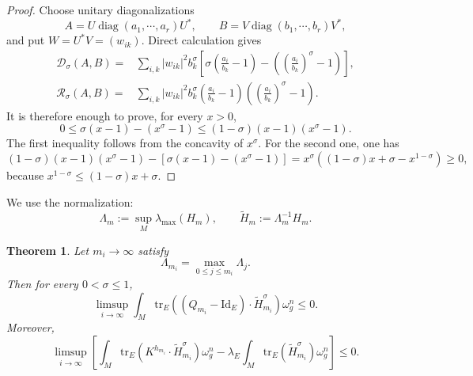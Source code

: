 \documentclass[12pt, reqno]{amsart}
\newcommand\cD{{\mathcal D}}
\newcommand\cR{{\mathcal R}}
\newcommand{\id}{\mathrm{Id}}
\theoremstyle{plain}
\newtheorem{thm}{Theorem}[section]
\theoremstyle{definition}
\newcommand{\btheorem}{\begin{thm}}
\newcommand{\etheorem}{\end{thm}}
\newcommand{\beq}{\begin{equation}}
\newcommand{\eeq}{\end{equation}}
\renewcommand{\tilde}{\widetilde}
\newcommand{\diag}{\operatorname{diag}}
\renewcommand{\>}{\rightarrow}
\newcommand{\tr}{\mathrm{tr}}
\numberwithin{equation}{section}
\begin{document}
\begin{proof}
	Choose unitary diagonalizations
	\[
	A=U\diag(a_1,\cdots,a_r)U^*,
	\qquad
	B=V\diag(b_1,\cdots,b_r)V^*,
	\]
	and put $W=U^*V=(w_{ik})$.  Direct calculation gives
	\begin{align}
	\cD_\sigma(A,B)
	={}&\sum_{i,k}|w_{ik}|^2b_k^\sigma
	\left[
	\sigma\left(\frac{a_i}{b_k}-1\right)
	-\left(\left(\frac{a_i}{b_k}\right)^\sigma-1\right)
	\right],
	\label{D double sum}\\
	\cR_\sigma(A,B)
	={}&\sum_{i,k}|w_{ik}|^2b_k^\sigma
	\left(\frac{a_i}{b_k}-1\right)
	\left(\left(\frac{a_i}{b_k}\right)^\sigma-1\right).
	\label{R double sum}
	\end{align}
	It is therefore enough to prove, for every $x>0$,
	\begin{equation}
	0\leq\sigma(x-1)-(x^\sigma-1)
	\leq(1-\sigma)(x-1)(x^\sigma-1).
	\label{scalar remainder inequality}
	\end{equation}
	The first inequality follows from the concavity of $x^\sigma$.  For the second one, one has
	\beq 
	(1-\sigma)(x-1)(x^\sigma-1)
	-\left[\sigma(x-1)-(x^\sigma-1)\right]
	=x^\sigma\left((1-\sigma)x+\sigma-x^{1-\sigma}\right)\geq0,
	\eeq
	because $x^{1-\sigma}\leq(1-\sigma)x+\sigma$. 
\end{proof}


\noindent
We use the normalization:
\begin{equation}
\Lambda_m:=\sup_M\lambda_{\max}(H_m),
\qquad
\tilde H_m:=\Lambda_m^{-1}H_m.
\label{Lambda tilde definition}
\end{equation}

\btheorem\label{record index thm}
Let $m_i\to\infty$ satisfy
\begin{equation}
\Lambda_{m_i}=\max_{0\leq j\leq m_i}\Lambda_j.
\label{record index condition}
\end{equation}
Then for every $0<\sigma\leq1$,
\begin{equation}
\limsup_{i\to\infty}
\int_M\tr_E\left(\left(Q_{m_i}-\id_E\right)\cdot\tilde H_{m_i}^\sigma\right)\omega_g^n
\leq0.
\label{record index conclusion}
\end{equation}
Moreover,
\begin{equation}
\limsup_{i\to\infty}
\left[
\int_M\tr_E\left(K^{h_{m_i}}\cdot\tilde H_{m_i}^\sigma\right)\omega_g^n
-\lambda_E\int_M\tr_E\left(\tilde H_{m_i}^\sigma\right)\omega_g^n
\right]\leq0.
\label{record curvature estimate}
\end{equation}
\etheorem
\end{document}
